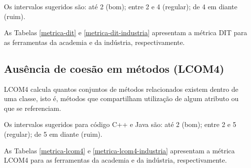Os intervalos sugeridos são: até 2 (bom); entre 2 e 4 (regular); de 4 em
diante (ruim).

As Tabelas \ref{metrica-dit} e \ref{metrica-dit-industria} apresentam a
métrica DIT para as ferramentas da academia e da indústria, respectivamente.



\subsection{Ausência de coesão em métodos (LCOM4)}

LCOM4 calcula quantos conjuntos de métodos relacionados existem dentro de uma
classe, isto é, métodos que compartilham utilização de algum atributo ou que
se referenciam.

Os intervalos sugeridos para código C++ e Java são: até 2 (bom); entre 2 e 5
(regular); de 5 em diante (ruim).

As Tabelas \ref{metrica-lcom4} e \ref{metrica-lcom4-industria} apresentam a
métrica LCOM4 para as ferramentas da academia e da indústria, respectivamente.



